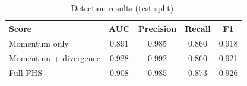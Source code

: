\begin{table}[t]
\centering
\caption{Detection results (test split).}
\label{tab:detection}
\begin{tabular}{lcccc}
\hline
Score & AUC & Precision & Recall & F1 \\
\hline
Momentum only & 0.891 & 0.985 & 0.860 & 0.918 \\
Momentum + divergence & 0.928 & 0.992 & 0.860 & 0.921 \\
Full PHS & 0.908 & 0.985 & 0.873 & 0.926 \\
\hline
\end{tabular}
\end{table}
